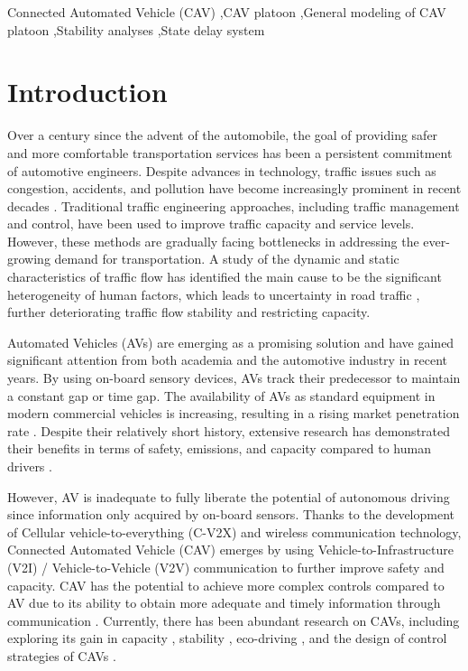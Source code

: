 \documentclass[a4paper]{cas-sc}
\begin{document}
\begin{keywords}
  Connected Automated Vehicle (CAV) \sep CAV platoon \sep General modeling of CAV platoon \sep Stability analyses \sep State delay system
\end{keywords}


\maketitle

\section{Introduction}
\label{Section 1}

Over a century since the advent of the automobile, the goal of providing safer and more comfortable transportation services has been a persistent commitment of automotive engineers. Despite advances in technology, traffic issues such as congestion, accidents, and pollution have become increasingly prominent in recent decades \citep{Schrank2012,Jin2016}. Traditional traffic engineering approaches, including traffic management and control, have been used to improve traffic capacity and service levels. However, these methods are gradually facing bottlenecks in addressing the ever-growing demand for transportation. A study of the dynamic and static characteristics of traffic flow has identified the main cause to be the significant heterogeneity of human factors, which leads to uncertainty in road traffic \citep{Zhong2020,Ye2018,Arem2016,Yu2021}, further deteriorating traffic flow stability and restricting capacity.



Automated Vehicles (AVs) are emerging as a promising solution and have gained significant attention from both academia and the automotive industry in recent years. By using on-board sensory devices, AVs track their predecessor to maintain a constant gap or time gap. The availability of AVs as standard equipment in modern commercial vehicles is increasing, resulting in a rising market penetration rate \citep{Wilson2011}. Despite their relatively short history, extensive research has demonstrated their benefits in terms of safety, emissions, and capacity compared to human drivers \citep{Wang2019,Sarker2019,Dey2015}.


However, AV is inadequate to fully liberate the potential of autonomous driving since information only acquired by on-board sensors. Thanks to the development of Cellular vehicle-to-everything (C-V2X) and wireless communication technology, Connected Automated Vehicle (CAV) emerges by using Vehicle-to-Infrastructure (V2I) / Vehicle-to-Vehicle (V2V) communication to further improve safety and capacity. CAV has the potential to achieve more complex controls compared to AV due to its ability to obtain more adequate and timely information through communication \citep{Navas2019,Ruan2021,Zhou2021}. Currently, there has been abundant research on CAVs, including exploring its gain in capacity \citep{Ghiasi2017,Chang2020}, stability \citep{Zhou2019,Montanino2021}, eco-driving \citep{Qin2018,Ruan2022}, and the design of control strategies of CAVs \citep{Zhu2019,Chen2021}. 
\end{document}
